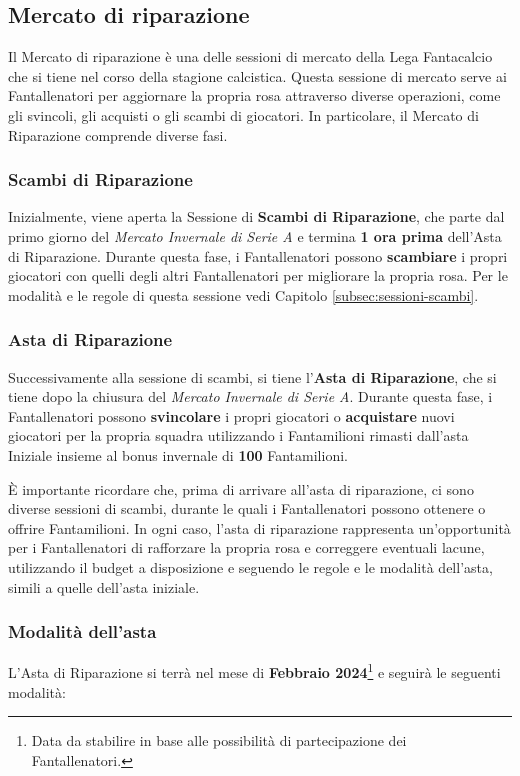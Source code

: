 \documentclass[12pt]{article}
\begin{document}
\subsection{Mercato di riparazione}
Il Mercato di riparazione è una delle sessioni di mercato della Lega Fantacalcio che si tiene nel corso della stagione calcistica. Questa sessione di mercato serve ai Fantallenatori per aggiornare la propria rosa attraverso diverse operazioni, come gli svincoli, gli acquisti o gli scambi di giocatori. 
In particolare, il Mercato di Riparazione comprende diverse fasi. 

\subsubsection{Scambi di Riparazione} \label{subsec:sessioni-scambi-di-riparazione}
Inizialmente, viene aperta la Sessione di \textbf{Scambi di Riparazione}, che parte dal primo giorno del \textit{Mercato Invernale di Serie A} e termina \textbf{1 ora prima} dell'Asta di Riparazione. Durante questa fase, i Fantallenatori possono \textbf{scambiare} i propri giocatori con quelli degli altri Fantallenatori per migliorare la propria rosa. Per le modalità e le regole di questa sessione vedi Capitolo \ref{subsec:sessioni-scambi}.

\subsubsection{Asta di Riparazione}
Successivamente alla sessione di scambi, si tiene l'\textbf{Asta di Riparazione}, che si tiene dopo la chiusura del \textit{Mercato Invernale di Serie A}. Durante questa fase, i Fantallenatori possono \textbf{svincolare} i propri giocatori o \textbf{acquistare} nuovi giocatori per la propria squadra utilizzando i Fantamilioni rimasti dall'asta Iniziale insieme al bonus invernale di \textbf{100} Fantamilioni. 

È importante ricordare che, prima di arrivare all'asta di riparazione, ci sono diverse sessioni di scambi, durante le quali i Fantallenatori possono ottenere o offrire Fantamilioni. In ogni caso, l'asta di riparazione rappresenta un'opportunità per i Fantallenatori di rafforzare la propria rosa e correggere eventuali lacune, utilizzando il budget a disposizione e seguendo le regole e le modalità dell'asta, simili a quelle dell'asta iniziale.
\subsubsection*{Modalità dell'asta}
L'Asta di Riparazione si terrà nel mese di \textbf{Febbraio 2024}\footnote{Data da stabilire in base alle possibilità di partecipazione dei Fantallenatori.} e seguirà le seguenti modalità:
\end{document}
